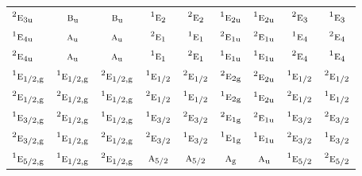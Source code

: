\documentclass[10pt,a4paper]{article}
\numberwithin{equation}{section}
\newcommand{\irr}[1]{\text{\normalfont\scshape #1}}
\newcommand{\conjpair}[1]{{}^{#1}}
\newcommand{\ptag}[1]{\mathrm{#1}}
\begin{document}
{\begin{longtable}{@{}lcccccccc@{}}
$\conjpair{2}\irr{e}_{3\ptag{u}}$ & $\irr{b}_{\ptag{u}}$ & $\irr{b}_{\ptag{u}}$ & $\conjpair{1}\irr{e}_{2}$ & $\conjpair{2}\irr{e}_{2}$ & $\conjpair{1}\irr{e}_{2\ptag{u}}$ & $\conjpair{1}\irr{e}_{2\ptag{u}}$ & $\conjpair{2}\irr{e}_{3}$ & $\conjpair{1}\irr{e}_{3}$\\
$\conjpair{1}\irr{e}_{4\ptag{u}}$ & $\irr{a}_{\ptag{u}}$ & $\irr{a}_{\ptag{u}}$ & $\conjpair{2}\irr{e}_{1}$ & $\conjpair{1}\irr{e}_{1}$ & $\conjpair{2}\irr{e}_{1\ptag{u}}$ & $\conjpair{2}\irr{e}_{1\ptag{u}}$ & $\conjpair{1}\irr{e}_{4}$ & $\conjpair{2}\irr{e}_{4}$\\
$\conjpair{2}\irr{e}_{4\ptag{u}}$ & $\irr{a}_{\ptag{u}}$ & $\irr{a}_{\ptag{u}}$ & $\conjpair{1}\irr{e}_{1}$ & $\conjpair{2}\irr{e}_{1}$ & $\conjpair{1}\irr{e}_{1\ptag{u}}$ & $\conjpair{1}\irr{e}_{1\ptag{u}}$ & $\conjpair{2}\irr{e}_{4}$ & $\conjpair{1}\irr{e}_{4}$\\
$\conjpair{1}\irr{e}_{1/2,\ptag{g}}$ & $\conjpair{1}\irr{e}_{1/2,\ptag{g}}$ & $\conjpair{2}\irr{e}_{1/2,\ptag{g}}$ & $\conjpair{1}\irr{e}_{1/2}$ & $\conjpair{2}\irr{e}_{1/2}$ & $\conjpair{2}\irr{e}_{2\ptag{g}}$ & $\conjpair{2}\irr{e}_{2\ptag{u}}$ & $\conjpair{1}\irr{e}_{1/2}$ & $\conjpair{2}\irr{e}_{1/2}$\\
$\conjpair{2}\irr{e}_{1/2,\ptag{g}}$ & $\conjpair{2}\irr{e}_{1/2,\ptag{g}}$ & $\conjpair{1}\irr{e}_{1/2,\ptag{g}}$ & $\conjpair{2}\irr{e}_{1/2}$ & $\conjpair{1}\irr{e}_{1/2}$ & $\conjpair{1}\irr{e}_{2\ptag{g}}$ & $\conjpair{1}\irr{e}_{2\ptag{u}}$ & $\conjpair{2}\irr{e}_{1/2}$ & $\conjpair{1}\irr{e}_{1/2}$\\
$\conjpair{1}\irr{e}_{3/2,\ptag{g}}$ & $\conjpair{2}\irr{e}_{1/2,\ptag{g}}$ & $\conjpair{1}\irr{e}_{1/2,\ptag{g}}$ & $\conjpair{1}\irr{e}_{3/2}$ & $\conjpair{2}\irr{e}_{3/2}$ & $\conjpair{2}\irr{e}_{1\ptag{g}}$ & $\conjpair{2}\irr{e}_{1\ptag{u}}$ & $\conjpair{1}\irr{e}_{3/2}$ & $\conjpair{2}\irr{e}_{3/2}$\\
$\conjpair{2}\irr{e}_{3/2,\ptag{g}}$ & $\conjpair{1}\irr{e}_{1/2,\ptag{g}}$ & $\conjpair{2}\irr{e}_{1/2,\ptag{g}}$ & $\conjpair{2}\irr{e}_{3/2}$ & $\conjpair{1}\irr{e}_{3/2}$ & $\conjpair{1}\irr{e}_{1\ptag{g}}$ & $\conjpair{1}\irr{e}_{1\ptag{u}}$ & $\conjpair{2}\irr{e}_{3/2}$ & $\conjpair{1}\irr{e}_{3/2}$\\
$\conjpair{1}\irr{e}_{5/2,\ptag{g}}$ & $\conjpair{1}\irr{e}_{1/2,\ptag{g}}$ & $\conjpair{2}\irr{e}_{1/2,\ptag{g}}$ & $\irr{a}_{5/2}$ & $\irr{a}_{5/2}$ & $\irr{a}_{\ptag{g}}$ & $\irr{a}_{\ptag{u}}$ & $\conjpair{1}\irr{e}_{5/2}$ & $\conjpair{2}\irr{e}_{5/2}$\\

\end{longtable}}
\end{document}
